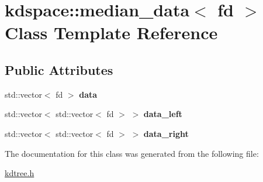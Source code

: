 \hypertarget{classkdspace_1_1median__data}{}\section{kdspace\+:\+:median\+\_\+data$<$ fd $>$ Class Template Reference}
\label{classkdspace_1_1median__data}
\subsection*{Public Attributes}
\begin{DoxyCompactItemize}
\item 
\mbox{\label{classkdspace_1_1median__data_a9a41462b5c13293ee2d547ae85d2215e}} 
std\+::vector$<$ fd $>$ {\bfseries data}
\item 
\mbox{\label{classkdspace_1_1median__data_aed7ddade6ee2f24873de366059301a4f}} 
std\+::vector$<$ std\+::vector$<$ fd $>$ $>$ {\bfseries data\+\_\+left}
\item 
\mbox{\label{classkdspace_1_1median__data_ab79689b91618831f957372b0af7fd298}} 
std\+::vector$<$ std\+::vector$<$ fd $>$ $>$ {\bfseries data\+\_\+right}
\end{DoxyCompactItemize}


The documentation for this class was generated from the following file\+:\begin{DoxyCompactItemize}
\item 
\hyperlink{kdtree_8h}{kdtree.\+h}\end{DoxyCompactItemize}
